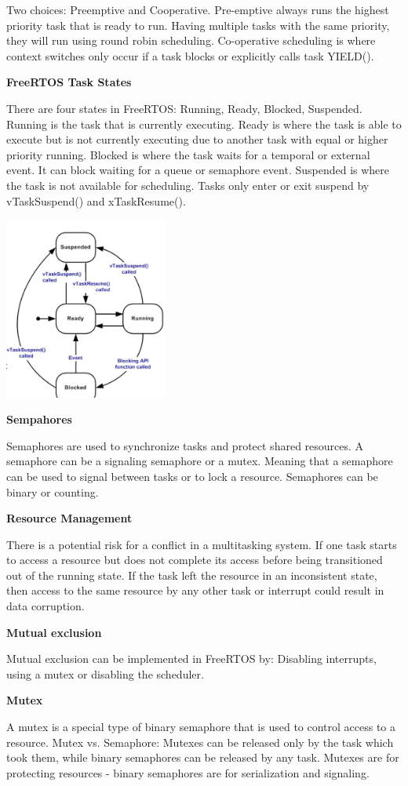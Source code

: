 Two choices: Preemptive and Cooperative. Pre-emptive always runs the highest priority task that is ready to run.
Having multiple tasks with the same priority, they will run using round robin scheduling.
Co-operative scheduling is where context switches only occur if a task blocks or explicitly calls task YIELD().

\newpage

\textbf{FreeRTOS Task States}

There are four states in FreeRTOS:
Running, Ready, Blocked, Suspended.
Running is the task that is currently executing.
Ready is where the task is able to execute but is not currently executing due to another task with equal or higher priority running.
Blocked is where the task waits for a temporal or external event. It can block waiting for a queue or semaphore event.
Suspended is where the task is not available for scheduling. Tasks only enter or exit suspend by vTaskSuspend() and xTaskResume().

\begin{center}
	\includegraphics[width=0.4\textwidth]{images/freeStates.png}
\end{center}

\textbf{Sempahores}

Semaphores are used to synchronize tasks and protect shared resources.
A semaphore can be a signaling semaphore or a mutex.
Meaning that a semaphore can be used to signal between tasks or to lock a resource.
Semaphores can be binary or counting.

\textbf{Resource Management}

There is a potential risk for a conflict in a multitasking system. If one task starts to access a resource
but does not complete its access before being transitioned out of the running state. If the task left the resource
in an inconsistent state, then access to the same resource by any other task or interrupt could result in data corruption.

\textbf{Mutual exclusion}

Mutual exclusion can be implemented in FreeRTOS by: Disabling interrupts, using a mutex or disabling the scheduler.

\textbf{Mutex}

A mutex is a special type of binary semaphore that is used to control access to a resource.
Mutex vs. Semaphore: Mutexes can be released only by the task which took them, while binary semaphores can be released
by any task. Mutexes are for protecting resources - binary semaphores are for serialization and signaling.




